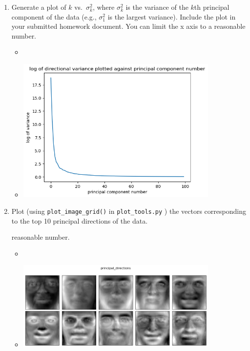 \documentclass[12pt,twoside]{article}
\begin{document}
\begin{enumerate}
\begin{enumerate}
\item Generate a plot of $k$ vs.~$\sigma^2_k$, where $\sigma^2_k$ is
the variance of the $k$th principal component of the data (e.g., $\sigma^2_1$
is the largest variance). 
Include the plot in your submitted homework document. You can limit the x axis to a reasonable number.
\begin{itemize}
\item \inputminted[firstline=52, lastline=64, breaklines=True]{python}{hw9.py}
\item \includegraphics[width=10cm]{homework/homework_9/images/hw9_1.png}
\end{itemize}


\item  Plot (using  \verb|plot_image_grid()| in
\verb|plot_tools.py| ) the vectors
corresponding to the top 10 principal directions of the data.

reasonable number.
\begin{itemize}
\item \inputminted[firstline=67, lastline=83, breaklines=True]{python}{hw9.py}
\item \includegraphics[width=10cm]{homework/homework_9/images/hw9_2.png}
\end{itemize}


\end{enumerate}
\end{enumerate}
\end{document}
